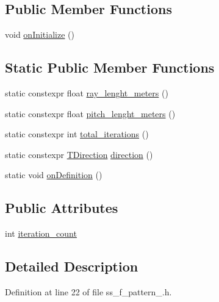 \subsection*{Public Member Functions}
\begin{DoxyCompactItemize}
\item 
void \hyperlink{structsm__dance__bot_1_1SS4_1_1SsFPattern1_af69988c9481251c8e830779732db18cb}{on\+Initialize} ()
\end{DoxyCompactItemize}
\subsection*{Static Public Member Functions}
\begin{DoxyCompactItemize}
\item 
static constexpr float \hyperlink{structsm__dance__bot_1_1SS4_1_1SsFPattern1_ab6c84af47649dfe8cc5f2097ab01968b}{ray\+\_\+lenght\+\_\+meters} ()
\item 
static constexpr float \hyperlink{structsm__dance__bot_1_1SS4_1_1SsFPattern1_a603b30123514bdab9efbfc8c2069587c}{pitch\+\_\+lenght\+\_\+meters} ()
\item 
static constexpr int \hyperlink{structsm__dance__bot_1_1SS4_1_1SsFPattern1_a5c074a09438a374f3c8b268360936025}{total\+\_\+iterations} ()
\item 
static constexpr \hyperlink{namespacesm__dance__bot_1_1SS4_a8cc908c11b286e3f0591930361cc427e}{T\+Direction} \hyperlink{structsm__dance__bot_1_1SS4_1_1SsFPattern1_a4d286cea10dd7a14743a89f5a2131dc5}{direction} ()
\item 
static void \hyperlink{structsm__dance__bot_1_1SS4_1_1SsFPattern1_a29e23974126c002b96ecd1d3df40632c}{on\+Definition} ()
\end{DoxyCompactItemize}
\subsection*{Public Attributes}
\begin{DoxyCompactItemize}
\item 
int \hyperlink{structsm__dance__bot_1_1SS4_1_1SsFPattern1_abd668281596d2fc992d26eec97e69cb6}{iteration\+\_\+count}
\end{DoxyCompactItemize}


\subsection{Detailed Description}


Definition at line 22 of file ss\+\_\+f\+\_\+pattern\+\_.\+h.



